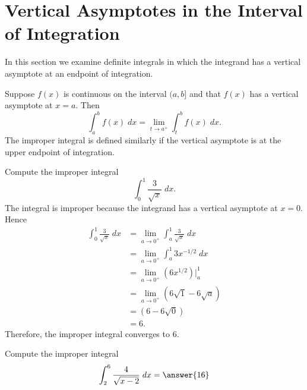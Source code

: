 \documentclass{ximera}
\begin{document}
\section{Vertical Asymptotes in the Interval of Integration}

In this section we examine definite integrals in which the integrand has a vertical asymptote at an endpoint of integration.

\begin{definition}
Suppose $f(x)$ is continuous on the interval $(a, b]$ and that $f(x)$ has a vertical asymptote at $x = a$.
Then
\[
\int_a^b f(x) \; dx = \lim_{t \to a^+} \int_t^b f(x) \; dx.
\]
The improper integral is defined similarly if the vertical asymptote is at the upper endpoint of integration.
\end{definition}

\begin{example}
Compute the improper integral
\[
\int_0^1 \frac{3}{\sqrt x} \; dx.
\]
The integral is improper because the integrand has a vertical asymptote at $x = 0$. Hence
\begin{align*}
\int_0^1 \frac{3}{\sqrt x} \; dx &= \lim_{a \to 0^+} \int_a^1 \frac{3}{\sqrt x} \; dx\\
                                 &= \lim_{a \to 0^+} \int_a^1 3x^{-1/2} \; dx\\
                                 &= \lim_{a \to 0^+} \left( 6x^{1/2}  \right) \bigg|_a^1\\
                                 &= \lim_{a \to 0^+} \left( 6\sqrt{1} - 6\sqrt{a}  \right) \\
                                 &= \left( 6 - 6\sqrt{0}  \right) \\
                                 &= 6.
\end{align*}
 Therefore, the improper integral converges to 6.
 \end{example}
 
\begin{problem}
Compute the improper integral
\[
\int_2^6 \frac{4}{\sqrt{x-2}} \; dx = \answer{16}
\]
\end{problem}

                                 
\begin{center}
\begin{foldable}
\end{foldable}
\end{center}
\end{document}
